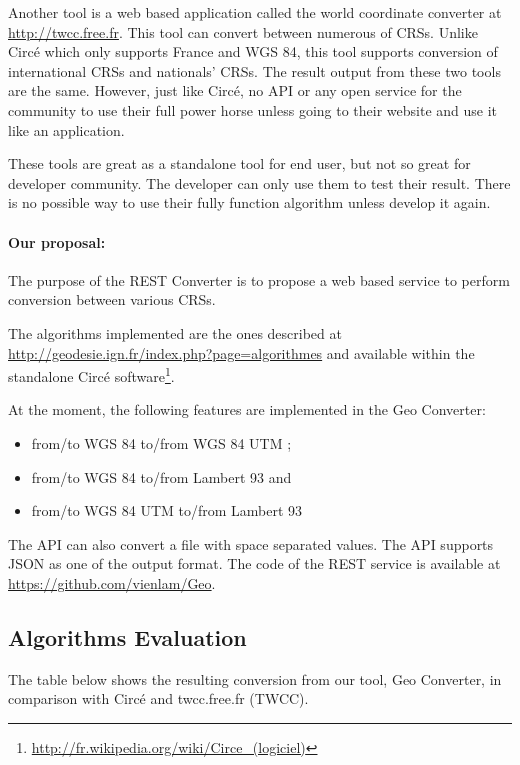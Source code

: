 Another tool is a web based application called the world coordinate converter at \url{http://twcc.free.fr}. This tool can convert between numerous of CRSs. Unlike Circ\'e which only supports France and WGS 84, this tool supports conversion of international CRSs and nationals' CRSs. The result output from these two tools are the same. However, just like Circ\'e, no API or any open service for the community to use their full power horse unless going to their website and use it like an application.

These tools are great as a standalone tool for end user, but not so great for developer community. The developer can only use them to test their result. There is no possible way to use their fully function algorithm unless develop it again. 
\paragraph{Our proposal:} The purpose of the REST Converter is to propose a web based service to perform conversion between various CRSs.

The algorithms implemented are the ones described at \url{http://geodesie.ign.fr/index.php?page=algorithmes} and available within the standalone Circ\'e software\footnote{\url{http://fr.wikipedia.org/wiki/Circe_(logiciel)}}.

At the moment, the following features are implemented in the Geo Converter:
\begin{itemize}
\item from/to WGS 84 to/from WGS 84 UTM ;
\item from/to WGS 84  to/from Lambert 93 and 
\item from/to WGS 84 UTM to/from Lambert 93
\end{itemize}   

The API can also convert a file with space separated values. The API supports JSON as one of the output format. The code of the REST service is available at \url{https://github.com/vienlam/Geo}.

\subsection{Algorithms Evaluation}

The table below shows the resulting conversion from our tool, Geo Converter, in comparison with Circ\'e and twcc.free.fr (TWCC).


